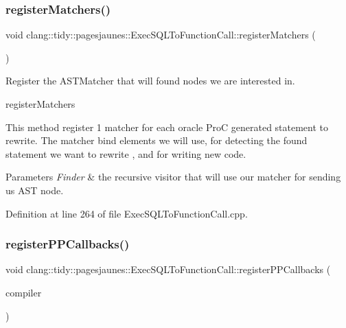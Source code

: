 \subsubsection{\texorpdfstring{register\+Matchers()}{registerMatchers()}}
{\footnotesize\ttfamily void clang\+::tidy\+::pagesjaunes\+::\+Exec\+S\+Q\+L\+To\+Function\+Call\+::register\+Matchers (\begin{DoxyParamCaption}\item[{ast\+\_\+matchers\+::\+Match\+Finder $\ast$}]{ }\end{DoxyParamCaption})\hspace{0.3cm}{\ttfamily [override]}}



Register the A\+S\+T\+Matcher that will found nodes we are interested in. 

register\+Matchers

This method register 1 matcher for each oracle ProC generated statement to rewrite. The matcher bind elements we will use, for detecting the found statement we want to rewrite , and for writing new code.


\begin{DoxyParams}{Parameters}
{\em Finder} & the recursive visitor that will use our matcher for sending us A\+ST node. \\
\hline
\end{DoxyParams}


Definition at line 264 of file Exec\+S\+Q\+L\+To\+Function\+Call.\+cpp.

\mbox{\label{classclang_1_1tidy_1_1pagesjaunes_1_1_exec_s_q_l_to_function_call_a394eba23190a0f6e0b8cebdec7527ea9}} 
\subsubsection{\texorpdfstring{register\+P\+P\+Callbacks()}{registerPPCallbacks()}}
{\footnotesize\ttfamily void clang\+::tidy\+::pagesjaunes\+::\+Exec\+S\+Q\+L\+To\+Function\+Call\+::register\+P\+P\+Callbacks (\begin{DoxyParamCaption}\item[{Compiler\+Instance \&}]{compiler }\end{DoxyParamCaption})\hspace{0.3cm}{\ttfamily [override]}}



